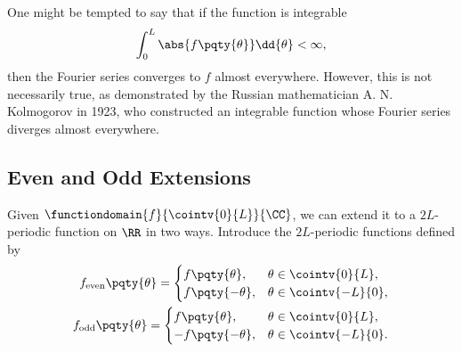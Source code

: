 One might be tempted to say that if the function is integrable
\begin{equation}
    \int_{0}^{L} \abs{f\pqty{\theta}} \dd{\theta} < \infty,
\end{equation}
then the Fourier series converges to \(f\) almost everywhere. However, this is not necessarily true, as demonstrated by the Russian mathematician A. N. Kolmogorov in 1923, who constructed an integrable function whose Fourier series diverges almost everywhere.

\subsection{Even and Odd Extensions}

Given \(\functiondomain{f}{\cointv{0}{L}}{\CC}\), we can extend it to a \(2L\)-periodic function on \(\RR\) in two ways. Introduce the \(2L\)-periodic functions defined by
\begin{subequations}
    \begin{align}
        f_{\text{even}} \pqty{\theta} = \begin{cases}
            f\pqty{\theta}, & \theta \in \cointv{0}{L}, \\
            f\pqty{-\theta}, & \theta \in \cointv{-L}{0},
        \end{cases} \\
        f_{\text{odd}} \pqty{\theta} = \begin{cases}
            f\pqty{\theta}, & \theta \in \cointv{0}{L}, \\
            - f\pqty{-\theta}, & \theta \in \cointv{-L}{0}.
        \end{cases}
    \end{align}
\end{subequations}

